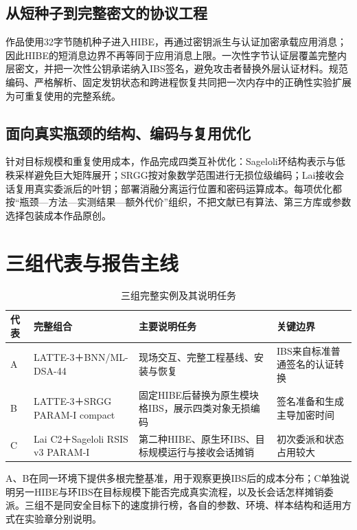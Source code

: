 \documentclass[UTF8,a4paper,12pt,oneside,openany,fontset=fandol]{ctexrep}
\begin{document}
\subsection{从短种子到完整密文的协议工程}
作品使用32字节随机种子进入HIBE，再通过密钥派生与认证加密承载应用消息；因此HIBE的短消息边界不再等同于应用消息上限。一次性字节认证层覆盖完整内层密文，并把一次性公钥承诺纳入IBS签名，避免攻击者替换外层认证材料。规范编码、严格解析、固定发钥状态和跨进程恢复共同把一次内存中的正确性实验扩展为可重复使用的完整系统。

\subsection{面向真实瓶颈的结构、编码与复用优化}
针对目标规模和重复使用成本，作品完成四类互补优化：Sageloli环结构表示与低秩采样避免巨大矩阵展开；SRGG按对象数学范围进行无损位级编码；Lai接收会话复用真实委派后的叶钥；部署消融分离运行位置和密码运算成本。每项优化都按“瓶颈—方法—实测结果—额外代价”组织，不把文献已有算法、第三方库或参数选择包装成本作品原创。

\section{三组代表与报告主线}
\begin{table}[htbp]
\centering
\small
\caption{三组完整实例及其说明任务}
\label{tab:three-representatives}
\begin{tabularx}{\textwidth}{@{}>{\raggedright\arraybackslash}p{}>{\raggedright\arraybackslash}p{}>{\raggedright\arraybackslash}X>{\raggedright\arraybackslash}p{}@{}}
\toprule
\rowcolor{black!8} 代表 & 完整组合 & 主要说明任务 & 关键边界 \\
\midrule
A & LATTE-3＋BNN/ML-DSA-44 & 现场交互、完整工程基线、安装与恢复 & IBS来自标准普通签名的认证转换 \\
B & LATTE-3＋SRGG PARAM-I compact & 固定HIBE后替换为原生模块格IBS，展示四类对象无损编码 & 签名准备和生成主导加密时间 \\
C & Lai C2＋Sageloli RSIS v3 PARAM-I & 第二种HIBE、原生环IBS、目标规模运行与接收会话摊销 & 初次委派和状态占用较大 \\
\bottomrule
\end{tabularx}
\end{table}

A、B在同一环境下提供多根完整基准，用于观察更换IBS后的成本分布；C单独说明另一HIBE与环IBS在目标规模下能否完成真实流程，以及长会话怎样摊销委派。三组不是同安全目标下的速度排行榜，各自的参数、环境、样本结构和适用方式在实验章分别说明。
\end{document}
